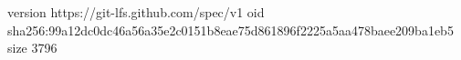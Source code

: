 version https://git-lfs.github.com/spec/v1
oid sha256:99a12dc0dc46a56a35e2c0151b8eae75d861896f2225a5aa478baee209ba1eb5
size 3796
